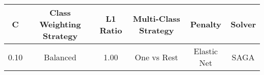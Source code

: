 \footnotesize
\begin{tabular}{cccccc}
\toprule
C & Class Weighting Strategy & L1 Ratio & Multi-Class Strategy & Penalty & Solver \\
\midrule
0.10 & Balanced & 1.00 & One vs Rest & Elastic Net & SAGA \\
\bottomrule
\end{tabular}

\normalsize